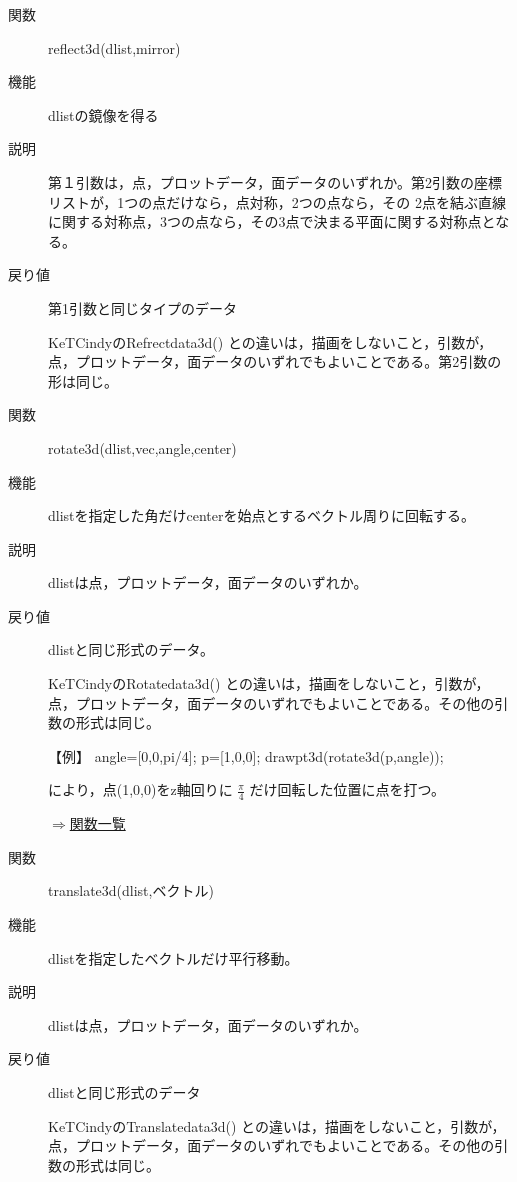 \documentclass[papersize,a4paper,12pt,uplatex]{jsarticle}
\begin{document}
\begin{description}
\vspace{\baselineskip}

\hypertarget{reflect3d}{}
\item[関数] reflect3d(dlist,mirror) 
\item[機能] dlistの鏡像を得る
\item[説明] 第１引数は，点，プロットデータ，面データのいずれか。第2引数の座標リストが，1つの点だけなら，点対称，2つの点なら，その 2点を結ぶ直線に関する対称点，3つの点なら，その3点で決まる平面に関する対称点となる。
\item[戻り値] 第1引数と同じタイプのデータ

KeTCindyのRefrectdata3d() との違いは，描画をしないこと，引数が，点，プロットデータ，面データのいずれでもよいことである。第2引数の形は同じ。

\vspace{\baselineskip}

\hypertarget{rotate3d}{}
\item[関数] rotate3d(dlist,vec,angle,center)
\item[機能] dlistを指定した角だけcenterを始点とするベクトル周りに回転する。
\item[説明] dlistは点，プロットデータ，面データのいずれか。
\item[戻り値] dlistと同じ形式のデータ。

KeTCindyのRotatedata3d() との違いは，描画をしないこと，引数が，点，プロットデータ，面データのいずれでもよいことである。その他の引数の形式は同じ。

【例】 angle=[0,0,pi/4]; 
  p=[1,0,0]; 
  drawpt3d(rotate3d(p,angle)); 

  により，点(1,0,0)をz軸回りに $\frac{\pi}{4}$ だけ回転した位置に点を打つ。 

\begin{flushright} \hyperlink{functionlist}{$\Rightarrow$関数一覧}\end{flushright}

\hypertarget{translate3d}{}
\item[関数] translate3d(dlist,ベクトル)
\item[機能] dlistを指定したベクトルだけ平行移動。
\item[説明]  dlistは点，プロットデータ，面データのいずれか。
\item[戻り値] dlistと同じ形式のデータ

KeTCindyのTranslatedata3d() との違いは，描画をしないこと，引数が，点，プロットデータ，面データのいずれでもよいことである。その他の引数の形式は同じ。


\end{description}
\end{document}
